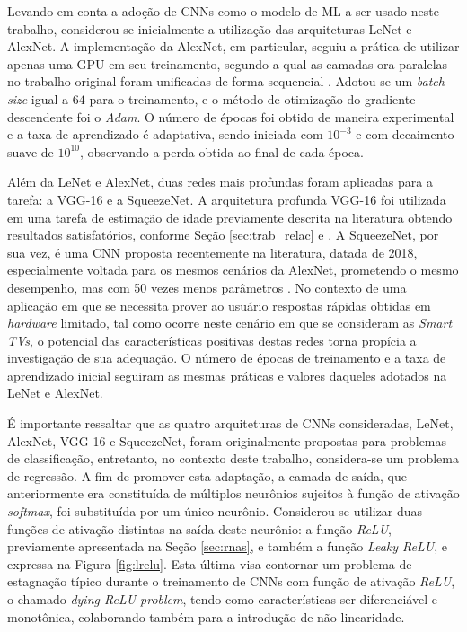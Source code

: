Levando em conta a adoção de CNNs como o modelo de ML a ser usado neste trabalho, considerou-se inicialmente a utilização das arquiteturas LeNet e AlexNet. A implementação da AlexNet, em particular, seguiu a prática de utilizar apenas uma GPU em seu treinamento, segundo a qual as camadas ora paralelas no trabalho original foram unificadas de forma sequencial \cite{tensorflow:alexnet}. Adotou-se um \emph{batch size} igual a $64$ para o treinamento, e o método de otimização do gradiente descendente foi o \emph{Adam}. O número de épocas foi obtido de maneira experimental e a taxa de aprendizado é adaptativa, sendo iniciada com $10^{-3}$ e com decaimento suave de $10^{10}$, observando a perda obtida ao final de cada época.

Além da LeNet e AlexNet, duas redes mais profundas foram aplicadas para a tarefa: a VGG-16 e a SqueezeNet. A arquitetura profunda VGG-16 foi utilizada em uma tarefa de estimação de idade previamente descrita na literatura obtendo resultados satisfatórios, conforme Seção \ref{sec:trab_relac} e  \cite{rothe2015dex}. A SqueezeNet, por sua vez, é uma CNN proposta recentemente na literatura, datada de 2018, especialmente voltada para os mesmos cenários da AlexNet, prometendo o mesmo desempenho, mas com 50 vezes menos parâmetros \cite{squeezenet}. No contexto de uma aplicação em que se necessita prover ao usuário respostas rápidas obtidas em \emph{hardware} limitado, tal como ocorre neste cenário em que se consideram as \emph{Smart TVs}, o potencial das características positivas destas redes torna propícia a investigação de sua adequação. O número de épocas de treinamento e a taxa de aprendizado inicial seguiram as mesmas práticas e valores daqueles adotados na LeNet e AlexNet.

É importante ressaltar que as quatro arquiteturas de CNNs consideradas, LeNet, AlexNet, VGG-16 e SqueezeNet, foram originalmente propostas para problemas de classificação, entretanto, no contexto deste trabalho, considera-se um problema de regressão. A fim de promover esta adaptação, a camada de saída, que anteriormente era constituída de múltiplos neurônios sujeitos à função de ativação \emph{softmax}, foi substituída por um único neurônio. Considerou-se utilizar duas funções de ativação distintas na saída deste neurônio: a função \emph{ReLU}, previamente apresentada na Seção \ref{sec:rnas}, e também a função \emph{Leaky ReLU}, e expressa na Figura \ref{fig:lrelu}. Esta última visa contornar um problema de estagnação típico durante o treinamento de CNNs com  função de ativação \emph{ReLU}, o chamado \emph{dying ReLU problem}, tendo como características ser diferenciável e monotônica, colaborando também para a introdução de não-linearidade.


